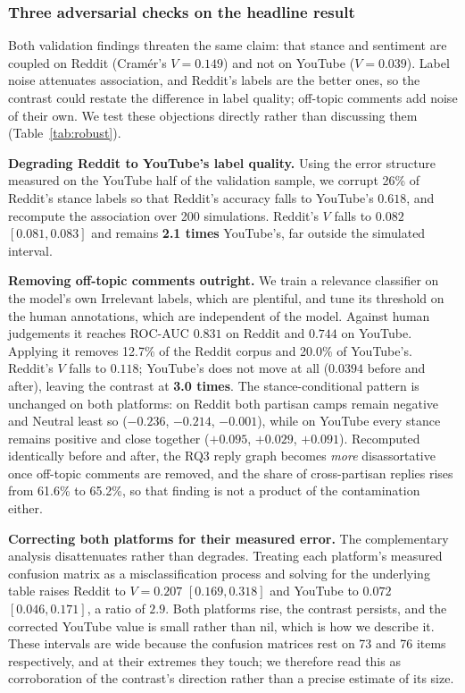 \documentclass[pdflatex,sn-basic,Numbered,iicol]{sn-jnl}
\begin{document}
\subsubsection{Three adversarial checks on the headline result}
Both validation findings threaten the same claim: that stance and sentiment are
coupled on Reddit (Cram\'er's $V = 0.149$) and not on YouTube ($V = 0.039$). Label
noise attenuates association, and Reddit's labels are the better ones, so the
contrast could restate the difference in label quality; off-topic comments add
noise of their own. We test these objections directly rather than discussing them
(Table~\ref{tab:robust}).

\textbf{Degrading Reddit to YouTube's label quality.} Using the error structure
measured on the YouTube half of the validation sample, we corrupt 26\% of Reddit's
stance labels so that Reddit's accuracy falls to YouTube's $0.618$, and recompute
the association over 200 simulations. Reddit's $V$ falls to $0.082$
$[0.081, 0.083]$ and remains \textbf{2.1 times} YouTube's, far outside the
simulated interval.

\textbf{Removing off-topic comments outright.} We train a relevance classifier on
the model's own Irrelevant labels, which are plentiful, and tune its threshold on
the human annotations, which are independent of the model. Against human
judgements it reaches ROC-AUC $0.831$ on Reddit and $0.744$ on YouTube. Applying
it removes 12.7\% of the Reddit corpus and 20.0\% of YouTube's. Reddit's $V$ falls
to $0.118$; YouTube's does not move at all ($0.0394$ before and after), leaving the
contrast at \textbf{3.0 times}. The stance-conditional pattern is unchanged on both
platforms: on Reddit both partisan camps remain negative and Neutral least so
($-0.236$, $-0.214$, $-0.001$), while on YouTube every stance remains positive and
close together ($+0.095$, $+0.029$, $+0.091$). Recomputed identically before and
after, the RQ3 reply graph becomes \emph{more} disassortative once off-topic
comments are removed, and the share of cross-partisan replies rises from 61.6\% to
65.2\%, so that finding is not a product of the contamination either.

\textbf{Correcting both platforms for their measured error.} The complementary
analysis disattenuates rather than degrades. Treating each platform's measured
confusion matrix as a misclassification process and solving for the underlying
table raises Reddit to $V=0.207$ $[0.169, 0.318]$ and YouTube to $0.072$
$[0.046, 0.171]$, a ratio of $2.9$. Both platforms rise, the contrast persists, and
the corrected YouTube value is small rather than nil, which is how we describe it.
These intervals are wide because the confusion matrices rest on 73 and 76 items
respectively, and at their extremes they touch; we therefore read this as
corroboration of the contrast's direction rather than a precise estimate of its
size.
\end{document}
